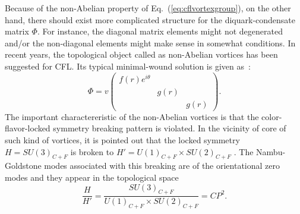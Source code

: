 \documentclass[prd, showpacs,nofootinbib,amsmath,amssymb]{revtex4}
\begin{document}
Because of the non-Abelian property of Eq.~(\ref{eq:cflvortexgroup}), on the other hand, 
there should exist more complicated structure for the diquark-condensate matrix $\Phi$. For instance, the
diagonal matrix elements might not degenerated and/or the non-diagonal elements might make sense in somewhat conditions.
In recent years, the topological object called as non-Abelian vortices has been suggested for
CFL.
Its typical minimal-wound solution is given
as~\cite{balachandran2006semisuperfluid,nakano2008non,eto2009color}:
\begin{equation}
  \label{eq:nvortex}
  \Phi = v\begin{pmatrix}
   f(r)e^{i\theta} & & \\ & g(r) & \\ & & g(r)
  \end{pmatrix}.
\end{equation}
The important charactereristic of the non-Abelian vortices
is that the color-flavor-locked symmetry breaking pattern is violated. In the vicinity of core of such kind of vortices, it is pointed out that the locked symmetry $H={SU(3)_{C+F}}$ is broken to
$H' =U(1)_{C+F} \times SU(2)_{C+F}$ \cite{nakano2008non,vinci2012spontaneous}.
The Nambu-Goldstone modes associated with this breaking are of the orientational zero modes and they appear in the
topological space
\begin{equation}
  \label{eq:cp2}
 \frac{H}{H'} = \frac{SU(3)_{C+F}}{U(1)_{C+F} \times SU(2)_{C+F}} = CP^2.
\end{equation}
\end{document}
